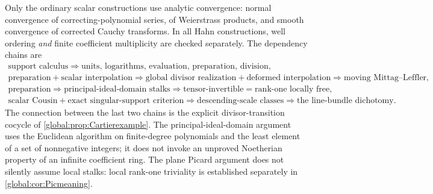 \documentclass[11pt,letterpaper]{article}
\theoremstyle{definition}
\theoremstyle{remark}
\numberwithin{equation}{section}
\begin{document}
Only the ordinary scalar constructions use analytic convergence: normal convergence of correcting-polynomial series, of Weierstrass products, and smooth convergence of corrected Cauchy transforms. In all Hahn constructions, well ordering \emph{and} finite coefficient multiplicity are checked separately. The dependency chains are
\[
  \begin{gathered}
  \text{support calculus}\Longrightarrow
  \text{units, logarithms, evaluation, preparation, division},\\
  \text{preparation}+\text{scalar interpolation}\Longrightarrow
  \text{global divisor realization}+\text{deformed interpolation}
  \Longrightarrow\text{moving Mittag--Leffler},\\
  \text{preparation}\Longrightarrow\text{principal-ideal-domain stalks}
  \Longrightarrow\text{tensor-invertible}=\text{rank-one locally free},\\
  \text{scalar Cousin}+\text{exact singular-support criterion}
  \Longrightarrow\text{descending-scale classes}
  \Longrightarrow\text{the line-bundle dichotomy}.
  \end{gathered}
\]
The connection between the last two chains is the explicit divisor-transition cocycle of \cref{global:prop:Cartierexample}. The principal-ideal-domain argument uses the Euclidean algorithm on finite-degree polynomials and the least element of a set of nonnegative integers; it does not invoke an unproved Noetherian property of an infinite coefficient ring. The plane Picard argument does not silently assume local stalks: local rank-one triviality is established separately in \cref{global:cor:Picmeaning}.
\end{document}
